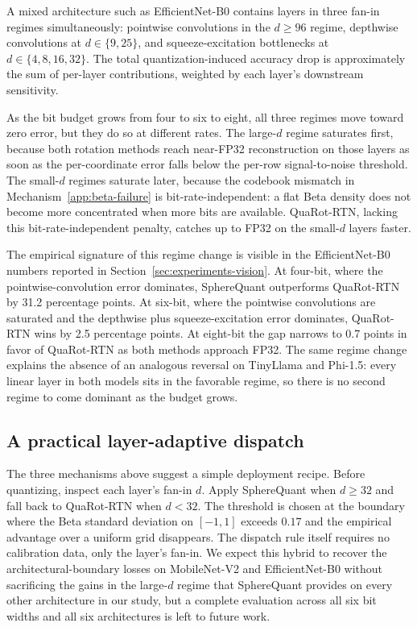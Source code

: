 A mixed architecture such as EfficientNet-B0 contains layers in three
fan-in regimes simultaneously: pointwise convolutions in the
$d \geq 96$ regime, depthwise convolutions at $d \in \{9, 25\}$, and
squeeze-excitation bottlenecks at $d \in \{4, 8, 16, 32\}$. The
total quantization-induced accuracy drop is approximately the sum of
per-layer contributions, weighted by each layer's downstream
sensitivity.

As the bit budget grows from four to six to eight, all three regimes
move toward zero error, but they do so at different rates. The
large-$d$ regime saturates first, because both rotation methods reach
near-FP32 reconstruction on those layers as soon as the per-coordinate
error falls below the per-row signal-to-noise threshold. The small-$d$
regimes saturate later, because the codebook mismatch in
Mechanism~\ref{app:beta-failure} is bit-rate-independent: a flat Beta
density does not become more concentrated when more bits are
available. QuaRot-RTN, lacking this bit-rate-independent penalty,
catches up to FP32 on the small-$d$ layers faster.

The empirical signature of this regime change is visible in the
EfficientNet-B0 numbers reported in
Section~\ref{sec:experiments-vision}. At four-bit, where the
pointwise-convolution error dominates, SphereQuant outperforms
QuaRot-RTN by 31.2 percentage points. At six-bit, where the pointwise
convolutions are saturated and the depthwise plus squeeze-excitation
error dominates, QuaRot-RTN wins by 2.5 percentage points. At
eight-bit the gap narrows to 0.7 points in favor of QuaRot-RTN as
both methods approach FP32. The same regime change explains the
absence of an analogous reversal on TinyLlama and Phi-1.5: every
linear layer in both models sits in the favorable regime, so there is
no second regime to come dominant as the budget grows.

\subsection{A practical layer-adaptive dispatch}
\label{app:hybrid}

The three mechanisms above suggest a simple deployment recipe.
Before quantizing, inspect each layer's fan-in $d$. Apply SphereQuant
when $d \geq 32$ and fall back to QuaRot-RTN when $d < 32$. The
threshold is chosen at the boundary where the Beta standard deviation
on $[-1, 1]$ exceeds $0.17$ and the empirical advantage over a uniform
grid disappears. The dispatch rule itself requires no calibration
data, only the layer's fan-in. We expect this hybrid to recover the
architectural-boundary losses on MobileNet-V2 and EfficientNet-B0
without sacrificing the gains in the large-$d$ regime that SphereQuant
provides on every other architecture in our study, but a complete
evaluation across all six bit widths and all six architectures is
left to future work.

